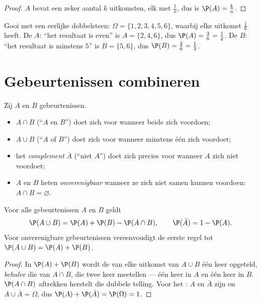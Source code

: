 \begin{proof}
$A$ bevat een zeker aantal $k$ uitkomsten, elk met  $\frac1n$, dus is
$\P(A) = \frac kn$.
\end{proof}

\begin{example}\label{ex:g10:proba:die}
Gooi met een eerlijke dobbelsteen: $\Omega = \{1, 2, 3, 4, 5, 6\}$, waarbij
elke uitkomst  $\frac16$ heeft. De  $A$: ``het resultaat is
even'' is $A = \{2, 4, 6\}$, dus $\P(A) = \frac36 = \frac12$. De 
$B$: ``het resultaat is minstens $5$'' is $B = \{5, 6\}$, dus
$\P(B) = \frac26 = \frac13$.
\end{example}

\section{Gebeurtenissen combineren}

\begin{definition}\label{def:g10:proba:operations}
Zij $A$ en $B$ gebeurtenissen.
\begin{itemize}
  \item $A \cap B$ (``$A$ en $B$'') doet zich voor wanneer beide zich
        voordoen;
  \item $A \cup B$ (``$A$ of $B$'') doet zich voor wanneer minstens één zich
        voordoet;
  \item het \emph{complement} $\bar A$ (``niet $A$'') doet
        zich precies voor wanneer $A$ zich niet voordoet;
  \item $A$ en $B$ heten \emph{onverenigbaar} wanneer ze
        zich niet samen kunnen voordoen: $A \cap B = \varnothing$.
\end{itemize}
\end{definition}

\begin{theorem}[Somregels]\label{thm:g10:proba:addition}
Voor alle gebeurtenissen $A$ en $B$ geldt
\[
\P(A \cup B) = \P(A) + \P(B) - \P(A \cap B),
\qquad
\P(\bar A) = 1 - \P(A) .
\]
Voor onverenigbare gebeurtenissen vereenvoudigt de eerste regel tot
$\P(A \cup B) = \P(A) + \P(B)$.
\end{theorem}

\begin{proof}
In $\P(A) + \P(B)$ wordt de  van elke uitkomst van $A \cup B$ één keer
opgeteld, \emph{behalve} die van $A \cap B$, die twee keer meetellen --- één
keer in $A$ en één keer in $B$. $\P(A \cap B)$ aftrekken herstelt die dubbele
telling. Voor het : $A$ en $\bar A$ zijn  en
$A \cup \bar A = \Omega$, dus $\P(A) + \P(\bar A) = \P(\Omega) = 1$.
\end{proof}

